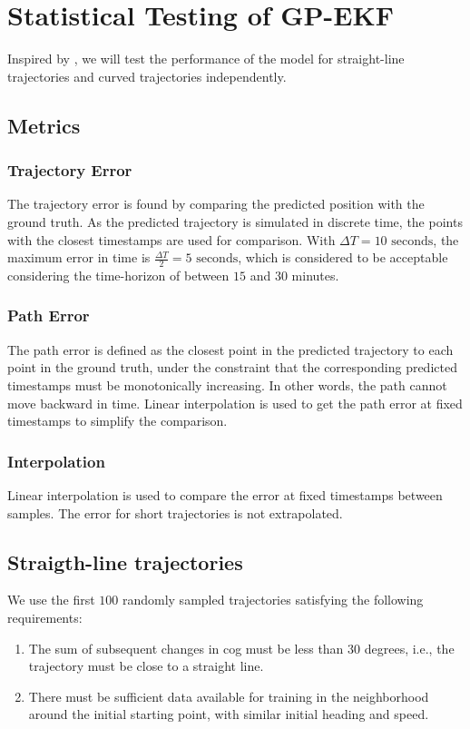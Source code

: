 \chapter{Statistical Testing of GP-EKF}
Inspired by \cite{hexeberg}, we will test the performance of the model for straight-line trajectories and curved trajectories independently.

\section{Metrics}
\subsection{Trajectory Error}
The trajectory error is found by comparing the predicted position with the ground truth. As the predicted trajectory is simulated in discrete time, the points with the closest timestamps are used for comparison. With $\Delta T = 10\text{ seconds}$, the maximum error in time is $\frac{\Delta T}{2} = 5 \text{ seconds}$, which is considered to be acceptable considering the time-horizon of between $15$ and $30$ minutes. 
\subsection{Path Error}
The path error is defined as the closest point in the predicted trajectory to each point in the ground truth, under the constraint that the corresponding predicted timestamps must be monotonically increasing. In other words, the path cannot move backward in time. Linear interpolation is used to get the path error at fixed timestamps to simplify the comparison. 

\subsection{Interpolation}
Linear interpolation is used to compare the error at fixed timestamps between samples. The error for short trajectories is not extrapolated.

\section{Straigth-line trajectories}
We use the first $100$ randomly sampled trajectories satisfying the following requirements:
\begin{enumerate}
    \item The sum of subsequent changes in \acrshort{cog} must be less than $30$ degrees, i.e., the trajectory must be close to a straight line.
    \item There must be sufficient data available for training in the neighborhood around the initial starting point, with similar initial heading and speed.
\end{enumerate}


